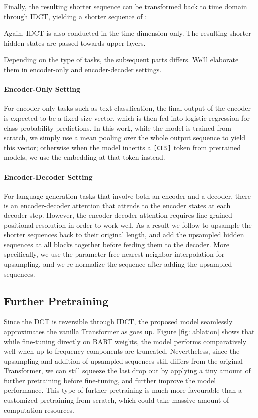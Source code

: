 \documentclass[11pt]{article}
\begin{document}
Finally, the resulting shorter sequence  can be transformed back to time domain through IDCT, yielding a shorter sequence of :

Again, IDCT is also conducted in the time dimension only. The resulting shorter hidden states are passed towards upper layers. 

Depending on the type of tasks, the subsequent parts differs. We'll elaborate them in encoder-only and encoder-decoder settings.

\paragraph{Encoder-Only Setting} For encoder-only tasks such as text classification, the final output of the encoder is expected to be a fixed-size vector, which is then fed into logistic regression for class probability predictions. In this work, while the model is trained from scratch, we simply use a mean pooling over the whole output sequence to yield this vector; otherwise when the model inherits a \texttt{[CLS]} token from pretrained models, we use the embedding at that token instead.

\paragraph{Encoder-Decoder Setting} For language generation tasks that involve both an encoder and a decoder, there is an encoder-decoder attention that attends to the encoder states at each decoder step. However, the encoder-decoder attention requires fine-grained positional resolution in order to work well. As a result we follow \citet{dai2020funnel} to upsample the shorter sequences back to their original length, and add the upsampled hidden sequences at all blocks together before feeding them to the decoder. More specifically, we use the parameter-free nearest neighbor interpolation for upsampling, and we re-normalize the sequence after adding the upsampled sequences.



\subsection{Further Pretraining}
\label{sec: further_pretrain}
Since the DCT is reversible through IDCT, the proposed model seamlessly approximates the vanilla Transformer as  goes up. Figure \ref{fig: ablation} shows that while fine-tuning directly on BART \cite{lewis2019bart} weights, the model performs comparatively well when up to  frequency components are truncated. Nevertheless, since the upsampling and addition of upsampled sequences still differs from the original Transformer, we can still squeeze the last drop out by applying a tiny amount of further pretraining before fine-tuning, and further improve the model performance. This type of further pretraining is much more favourable than a customized pretraining from scratch, which could take massive amount of computation resources. 
\end{document}
